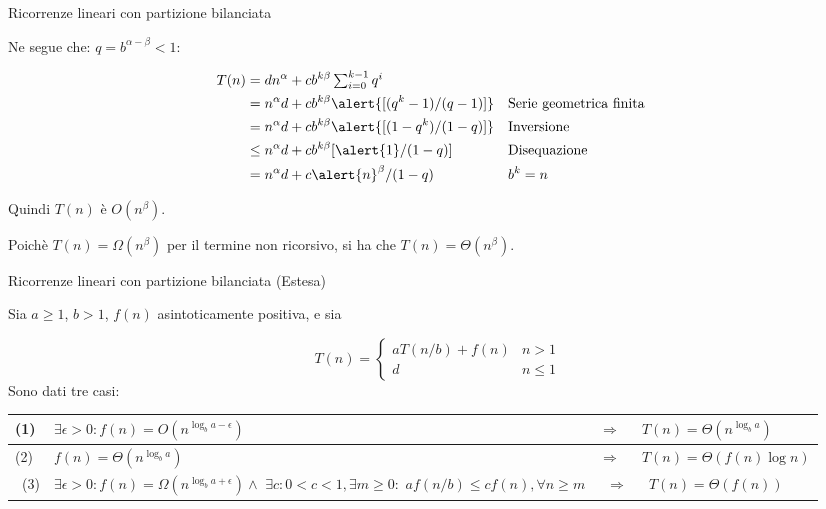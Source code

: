 \begin{frame}{Ricorrenze lineari con partizione bilanciata}
	

Ne segue che: $q = b^{\alpha-\beta} < 1$:

\begin{align*}
T(n) &= dn^\alpha  + cb^{k\beta} \textstyle\sum_{i=0}^{k-1} q^i \\
&= n^\alpha d + cb^{k\beta} \alert{[(q^k-1)/(q-1)]} && \textrm{Serie geometrica finita}\\
&= n^\alpha d + cb^{k\beta} \alert{[(1 - q^k)/(1 - q)]} && \textrm{Inversione}\\
&\le n^\alpha d + cb^{k\beta} [\alert{1}/(1 - q)] && \textrm{Disequazione}\\
&= n^\alpha d + c\alert{n}^\beta/(1 - q) && b^k=n
\end{align*}

\BIL
\item Quindi $T(n)$ è $O(n^\beta)$. 
\item Poichè $T(n) = \Omega(n^\beta)$ per il termine non ricorsivo, si ha che
$T(n) = \Theta(n^\beta)$. 
\EIL

\end{frame}




\begin{frame}{Ricorrenze lineari con partizione bilanciata (Estesa)}

\begin{myboxtitle}[Teorema]
Sia $a \geq 1$, $b > 1$, $f(n)$ asintoticamente positiva, e sia 

\[
T(n) = \begin{cases}
     a T(n/b) + f(n) & n > 1 \\
     d & n \leq 1
  \end{cases} 
\]
Sono dati tre casi:

\vspace{-12pt}
\bgroup
\begin{center}
\def\arraystretch{1.5}
\begin{tabular}{|P{0.5cm}|P{5cm}P{0.4cm}P{3.7cm}|}
\hline
(1) & $\exists \epsilon>0: f(n) = O(n^{\log_b a - \epsilon})$ & $\Rightarrow$ & $T(n) = \Theta(n^{\log_b a})$\\
\hline
(2) & $f(n) = \Theta(n^{\log_b a})$ & $\Rightarrow$ & $T(n) = \Theta(f(n) \log n)$ \\
\hline
~\newline(3) & $\exists \epsilon>0: f(n) = \Omega(n^{\log_b a + \epsilon}) \wedge {}$\newline
$\exists c: 0 < c < 1, \exists m \geq 0:$  \newline
$af(n/b) \leq cf(n), \forall n \geq m$
& ~\newline $\Rightarrow$ 
& ~\newline $T(n) = \Theta(f(n))$\\
\hline
\end{tabular}
\end{center}
\egroup

\end{myboxtitle}

\end{frame}


